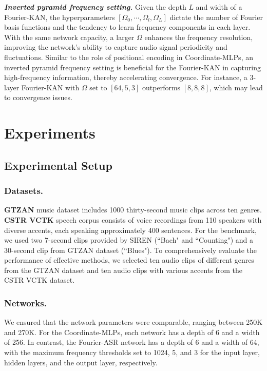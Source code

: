\documentclass[letterpaper]{article} %
\begin{document}
\textbf{\textit{Inverted pyramid frequency setting.}}
Given the depth \(L\) and width of a Fourier-KAN, the hyperparameters \([\Omega_0, \cdots, \Omega_l, \Omega_L]\) dictate the number of Fourier basis functions and the tendency to learn frequency components in each layer. With the same network capacity, a larger \(\Omega\) enhances the frequency resolution, improving the network's ability to capture audio signal periodicity and fluctuations. Similar to the role of positional encoding in Coordinate-MLPs, an inverted pyramid frequency setting is beneficial for the Fourier-KAN in capturing high-frequency information, thereby accelerating convergence. For instance, a 3-layer Fourier-KAN with \(\Omega\) set to $[64, 5, 3]$ outperforms \([8, 8, 8]\), which may lead to convergence issues.

\section{Experiments}
\subsection{Experimental Setup}
\subsubsection{Datasets.} 
\textbf{GTZAN} music dataset \cite{tzanetakis2001gtzan} includes 1000 thirty-second music clips across ten genres. \textbf{CSTR VCTK} speech corpus \cite{yamagishi2019cstr} consists of voice recordings from 110 speakers with diverse accents, each speaking approximately 400 sentences. For the benchmark, we used two 7-second clips provided by SIREN \cite{sitzmann2020siren} (``Bach" and ``Counting") and a 30-second clip from GTZAN 
 dataset (``Blues").  To comprehensively evaluate the performance of effective methods, we selected ten audio clips of different genres from the GTZAN dataset and ten audio clips with various accents from the CSTR VCTK dataset.

\subsubsection{Networks.} We ensured that the network parameters were comparable, ranging between 250K and 270K. For the Coordinate-MLPs, each network has a depth of 6 and a width of 256. In contrast, the Fourier-ASR network has a depth of 6 and a width of 64, with the maximum frequency thresholds set to 1024, 5, and 3 for the input layer, hidden layers, and the output layer, respectively.
\end{document}
